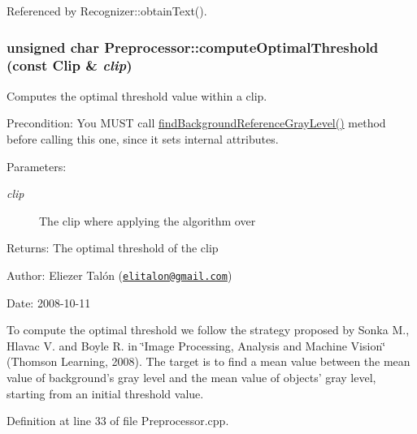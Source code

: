 Referenced by Recognizer::obtainText().\hypertarget{class_preprocessor_0e146cafa6b8b31f4f4ed189a970db7a}{
\subsubsection[computeOptimalThreshold]{\setlength{\rightskip}{0pt plus 5cm}unsigned char Preprocessor::computeOptimalThreshold (const {\bf Clip} \& {\em clip})}}
\label{class_preprocessor_0e146cafa6b8b31f4f4ed189a970db7a}


Computes the optimal threshold value within a clip. 

\begin{Desc}
\item[Precondition:]You MUST call \hyperlink{class_preprocessor_19aa90451cf6f99854833c05d3e71270}{findBackgroundReferenceGrayLevel()} method before calling this one, since it sets internal attributes.\end{Desc}
\begin{Desc}
\item[Parameters:]
\begin{description}
\item[{\em clip}]The clip where applying the algorithm over\end{description}
\end{Desc}
\begin{Desc}
\item[Returns:]The optimal threshold of the clip\end{Desc}
\begin{Desc}
\item[Author:]Eliezer Talón (\href{mailto:elitalon@gmail.com}{\tt elitalon@gmail.com}) \end{Desc}
\begin{Desc}
\item[Date:]2008-10-11\end{Desc}
To compute the optimal threshold we follow the strategy proposed by Sonka M., Hlavac V. and Boyle R. in \char`\"{}Image Processing, Analysis and Machine Vision\char`\"{} (Thomson Learning, 2008). The target is to find a mean value between the mean value of background's gray level and the mean value of objects' gray level, starting from an initial threshold value. 

Definition at line 33 of file Preprocessor.cpp.

